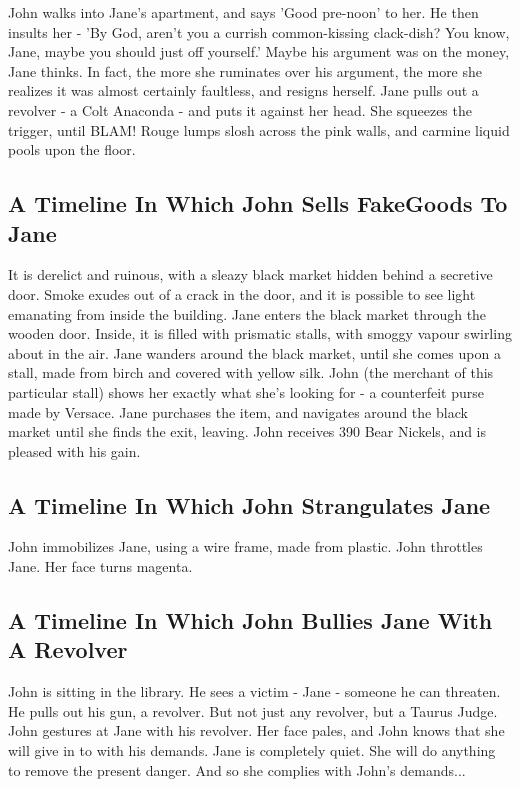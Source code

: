 \documentclass{article}
\begin{document}
John walks into Jane's apartment, and says 'Good pre{-}noon' to her.
He then insults her {-} 'By God, aren't you a currish common{-}kissing clack{-}dish?
You know, Jane, maybe you should just off yourself.'
Maybe his argument was on the money, Jane thinks.
In fact, the more she ruminates over his argument, the more she realizes it was almost certainly faultless, and resigns herself.
Jane pulls out a revolver {-} a Colt Anaconda {-} and puts it against her head.
She squeezes the trigger, until BLAM!
Rouge lumps slosh across the pink walls, and carmine liquid pools upon the floor.
\subsection{A Timeline In Which John Sells FakeGoods To Jane}


It is derelict and ruinous, with a sleazy black market hidden behind a secretive door.
Smoke exudes out of a crack in the door, and it is possible to see light emanating from inside the building.
Jane enters the black market through the wooden door.
Inside, it is filled with prismatic stalls, with smoggy vapour swirling about in the air.
Jane wanders around the black market, until she comes upon a stall, made from birch and covered with yellow silk.
John (the merchant of this particular stall) shows her exactly what she's looking for {-} a counterfeit purse made by Versace.
Jane purchases the item, and navigates around the black market until she finds the exit, leaving.
John receives 390 Bear Nickels, and is pleased with his gain.
\subsection{A Timeline In Which John Strangulates Jane}


John immobilizes Jane, using a wire frame, made from plastic.
John throttles Jane.
Her face turns magenta.
\subsection{A Timeline In Which John Bullies Jane With A Revolver}


John is sitting in the library.
He sees a victim {-} Jane {-} someone he can threaten. He pulls out his gun, a revolver.
But not just any revolver, but a Taurus Judge.
John gestures at Jane with his revolver. Her face pales, and John knows that she will give in to with his demands.
Jane is completely quiet. She will do anything to remove the present danger. And so she complies with John's demands...
\end{document}
